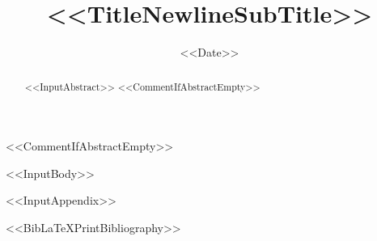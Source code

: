 \documentclass[<<DocumentClassOptions>>]{amsart}
\title[<<ShortTitle>>]{<<TitleNewlineSubTitle>>}
\date{<<Date>>}
\begin{document}
<<CommentIfAbstractEmpty>>\begin{abstract}
<<InputAbstract>>
<<CommentIfAbstractEmpty>>\end{abstract}


\makeatletter
{}
\makeatother

\maketitle

<<InputBody>>

\appendix
<<InputAppendix>>

<<BibLaTeXPrintBibliography>>
\end{document}
